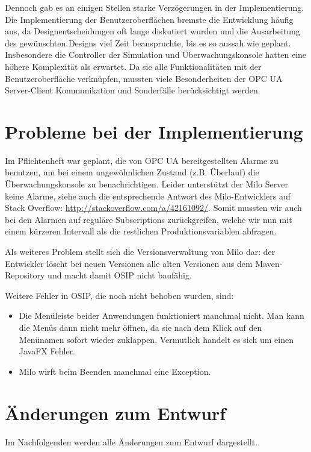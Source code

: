 \documentclass[parskip=full]{scrartcl}
\begin{document}
Dennoch gab es an einigen Stellen starke Verzögerungen in der Implementierung.
Die Implementierung der Benutzeroberflächen bremste die Entwicklung häufig aus, da Designentscheidungen oft lange
diskutiert wurden und die Ausarbeitung des gewünschten Designs viel Zeit beanspruchte, bis es so aussah wie geplant.
Insbesondere die Controller der Simulation und Überwachungskonsole hatten eine höhere Komplexität als erwartet.
Da sie alle Funktionalitäten mit der Benutzeroberfläche verknüpfen, mussten viele Besonderheiten der OPC UA Server-Client Kommunikation und Sonderfälle berücksichtigt werden.

\section{Probleme bei der Implementierung}
Im Pflichtenheft war geplant, die von OPC UA bereitgestellten Alarme zu benutzen, um bei einem ungewöhnlichen Zustand (z.B. Überlauf)
die Überwachungskonsole zu benachrichtigen. Leider unterstützt der Milo Server keine Alarme, siehe auch die entsprechende Antwort
des Milo-Entwicklers auf Stack Overflow: \href{http://stackoverflow.com/a/42161092/}{http://stackoverflow.com/a/42161092/}.
Somit mussten wir auch bei den Alarmen auf reguläre Subscriptions zurückgreifen, welche wir nun mit einem kürzeren Intervall
als die restlichen Produktionsvariablen abfragen.

Als weiteres Problem stellt sich die Versionsverwaltung von Milo dar: der Entwickler löscht bei neuen Versionen alle alten Versionen aus dem Maven-Repository und macht damit OSIP nicht baufähig.

Weitere Fehler in OSIP, die noch nicht behoben wurden, sind:
\begin{itemize}
 \item Die Menüleiste beider Anwendungen funktioniert manchmal nicht. Man kann die Menüs dann nicht mehr öffnen, da sie nach dem Klick auf den Menünamen sofort wieder zuklappen. Vermutlich handelt es sich um einen JavaFX Fehler.
 \item Milo wirft beim Beenden manchmal eine Exception.
\end{itemize}

\section{Änderungen zum Entwurf}
Im Nachfolgenden werden alle Änderungen zum Entwurf dargestellt.
\end{document}
